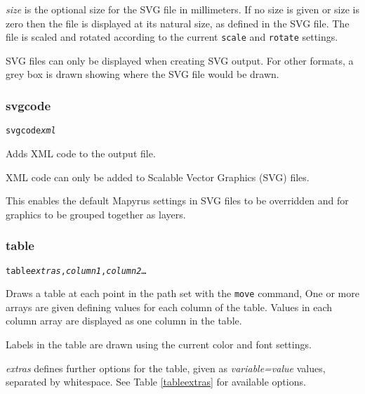 \textit{size} is the optional size for the SVG file
in millimeters.  If no size
is given or size is zero then the file is displayed at its natural size,
as defined in the SVG file.
The file is scaled and rotated according to the current \texttt{scale}
and \texttt{rotate} settings.

SVG files can only be displayed when creating
SVG output.  For other formats,
a grey box is drawn showing where the SVG file
would be drawn.

\subsubsection{svgcode}

\begin{alltt}
svgcode \textit{xml}
\end{alltt}

Adds XML code to the output file.

XML code can only be added to Scalable Vector Graphics (SVG) files.

This enables the default Mapyrus settings in SVG files to
be overridden and for graphics to be grouped together as layers.

\subsubsection{table}

\begin{alltt}
table \textit{extras}, \textit{column1}, \textit{column2} \dots
\end{alltt}

Draws a table at each point in the path set with the \texttt{move} command,
One or more arrays are given defining values for each column of the table.
Values in each column array are displayed as one column in the table.

Labels in the table are drawn using the current color and font settings.

\textit{extras} defines further options for the table, given as
\textit{variable=value} values, separated by whitespace.
See Table \ref{tableextras}
for available options.

